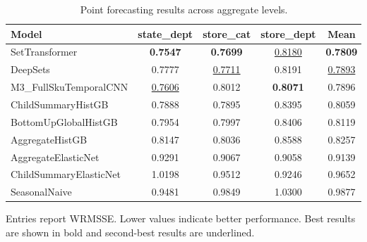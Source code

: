 \begin{table}[H]
\centering
\caption{Point forecasting results across aggregate levels.}
\label{tab:main_point}
\begin{threeparttable}
\begin{tabular}{lcccc}
\toprule
Model & state\_dept & store\_cat & store\_dept & Mean \\
\midrule
SetTransformer & \textbf{0.7547} & \textbf{0.7699} & \underline{0.8180} & \textbf{0.7809} \\
DeepSets & 0.7777 & \underline{0.7711} & 0.8191 & \underline{0.7893} \\
M3\_FullSkuTemporalCNN & \underline{0.7606} & 0.8012 & \textbf{0.8071} & 0.7896 \\
ChildSummaryHistGB & 0.7888 & 0.7895 & 0.8395 & 0.8059 \\
BottomUpGlobalHistGB & 0.7954 & 0.7997 & 0.8406 & 0.8119 \\
AggregateHistGB & 0.8147 & 0.8036 & 0.8588 & 0.8257 \\
AggregateElasticNet & 0.9291 & 0.9067 & 0.9058 & 0.9139 \\
ChildSummaryElasticNet & 1.0198 & 0.9512 & 0.9246 & 0.9652 \\
SeasonalNaive & 0.9481 & 0.9849 & 1.0300 & 0.9877 \\
\bottomrule
\end{tabular}
\begin{tablenotes}
\footnotesize \item Entries report WRMSSE. Lower values indicate better performance. Best results are shown in bold and second-best results are underlined.
\end{tablenotes}
\end{threeparttable}
\end{table}

